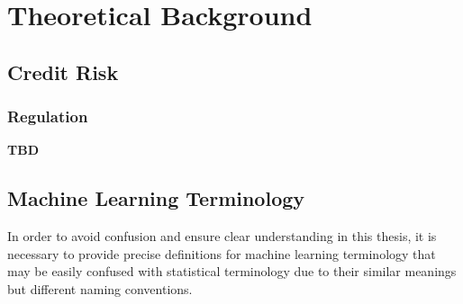 \chapter{Theoretical Background}
\label{chap:two}

\section{Credit Risk}

\subsection{Regulation}

\textbf{TBD}

\section{Machine Learning Terminology}
In order to avoid confusion and ensure clear understanding in this thesis, it is necessary to provide precise definitions for machine learning terminology that may be easily confused with statistical terminology due to their similar meanings but different naming conventions.
